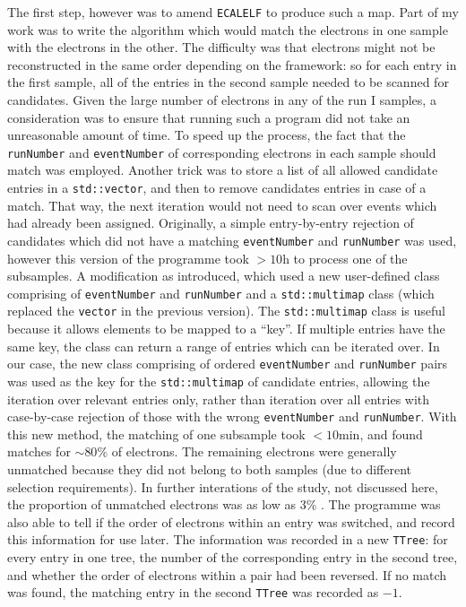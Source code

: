 \documentclass[10pt]{article}
\begin{document}
The first step, however was to amend \texttt{ECALELF} to produce such a map. Part of my work was to write the algorithm which would match the electrons in one sample with the electrons in the other. The difficulty was that electrons might not be reconstructed in the same order depending on the framework: so for each entry in the first sample, all of the entries in the second sample needed to be scanned for candidates. Given the large number of electrons in any of the run I samples, a consideration was to ensure that running such a program did not take an unreasonable amount of time. To speed up the process, the fact that the \texttt{runNumber} and \texttt{eventNumber} of corresponding electrons in each sample should match was employed. Another trick was to store a list of all allowed candidate entries in a \texttt{std::vector}, and then to remove candidates entries in case of a match. That way, the next iteration would not need to scan over events which had already been assigned. Originally, a simple entry-by-entry rejection of candidates which did not have a matching \texttt{eventNumber} and \texttt{runNumber} was used, however this version of the programme took $>10$h to process one of the subsamples. A modification as introduced, which used a new user-defined class comprising of \texttt{eventNumber} and \texttt{runNumber} and a \texttt{std::multimap} class (which replaced the \texttt{vector} in the previous version). The \texttt{std::multimap} class is useful because it allows elements to be mapped to a ``key''. If multiple entries have the same key, the class can return a range of entries which can be iterated over. In our case, the new class comprising of ordered \texttt{eventNumber} and \texttt{runNumber} pairs was used as the key for the  \texttt{std::multimap} of candidate entries, allowing the iteration over relevant entries only, rather than iteration over all entries with case-by-case rejection of those with the wrong \texttt{eventNumber} and \texttt{runNumber}. With this new method, the matching of one subsample took $<10$min, and found matches for $\sim 80\%$ of electrons. The remaining electrons were generally unmatched because they did not belong to both samples (due to different selection requirements). In further interations of the study, not discussed here, the proportion of unmatched electrons was as low as $3\%$ . The programme was also able to tell if the order of electrons within an entry was switched, and record this information for use later. The information was recorded in a new \texttt{TTree}: for every entry in one tree, the number of the corresponding entry in the second tree, and whether the order of electrons within a pair had been reversed. If no match was found, the matching entry in the second \texttt{TTree} was recorded as $-1$.
\end{document}

